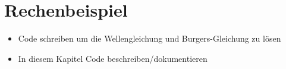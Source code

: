 %
%
%
%

\section{Rechenbeispiel\label{neuronal:section:rechenbeispiel}}

\begin{itemize}
    \item Code schreiben um die Wellengleichung und Burgers-Gleichung zu lösen
    \item In diesem Kapitel Code beschreiben/dokumentieren
\end{itemize}